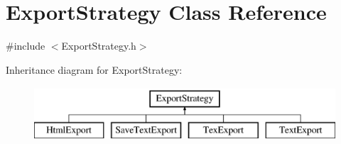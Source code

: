 \hypertarget{class_export_strategy}{\section{Export\-Strategy Class Reference}
\label{class_export_strategy}
}


{\ttfamily \#include $<$Export\-Strategy.\-h$>$}

Inheritance diagram for Export\-Strategy\-:\begin{figure}[H]
\begin{center}
\leavevmode
\includegraphics[height=2.000000cm]{class_export_strategy}
\end{center}
\end{figure}
